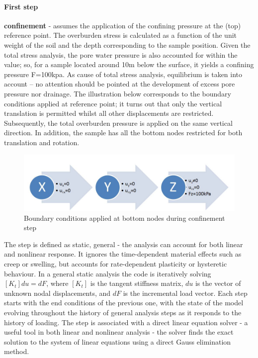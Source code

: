 \documentclass[12pt,a4paper]{report}
\begin{document}
\paragraph{First step}
\textbf{confinement }- assumes the application of the confining pressure at the (top) reference point. The overburden stress is calculated as a function of the unit weight of the soil and the depth corresponding to the sample position. Given the total stress analysis, the pore water pressure is also accounted for within the value; so, for a sample located around 10m below the surface, it yields a confining pressure F=100kpa. As cause of total stress analysis, equilibrium is taken into account – no attention should be pointed at the development of excess pore pressure nor drainage. The illustration below corresponds to the boundary conditions applied at reference point; it turns out that only the vertical translation is permitted whilst all other displacements are restricted. Subsequently, the total overburden pressure is applied on the same vertical direction. In addition, the sample has all the bottom nodes restricted for both translation and rotation. 

\begin{figure}[h!]
	\centering
	\includegraphics[width=0.6\linewidth]{"bc1d"}
	\caption{Boundary conditions applied at bottom nodes during confinement step}
	\label{bc1}
\end{figure}

The step is defined as static, general - the analysis can account for both linear and nonlinear response. It ignores the time-dependent material effects such as creep or swelling, but accounts for rate-dependent plasticity or hysteretic behaviour. In a general static analysis the code is iteratively solving $[K_t]{du}= {dF}$, where $[K_t]$ is the tangent stiffness matrix, ${du}$ is the vector of unknown nodal displacements, and ${dF}$ is the incremental load vector. Each step starts with the end conditions of the previous one, with the state of the model evolving throughout the history of general analysis steps as it responds to the history of loading. The step is associated with a direct linear equation solver - a useful tool in both linear and nonlinear analysis - the solver finds the exact solution to the system of linear equations using a direct Gauss elimination method. 
\end{document}
